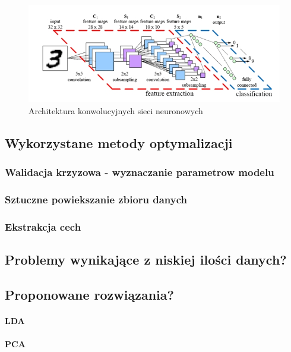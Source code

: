 \begin{figure}[ht!]
\centering
\includegraphics[scale=0.75]{res/cnn3.jpg}
\caption[Caption for LOF]{Architektura konwolucyjnych sieci neuronowych\footnotemark\label{cnn2}} 
\end{figure}

\subsection{Wykorzystane metody optymalizacji}
\subsubsection{Walidacja krzyzowa - wyznaczanie parametrow modelu}
\subsubsection{Sztuczne powiekszanie zbioru danych}
\subsubsection{Ekstrakcja cech}
\subsection{Problemy wynikające z niskiej ilości danych?}\label{problems}
\subsection{Proponowane rozwiązania?}
\paragraph{LDA}
\paragraph{PCA}

